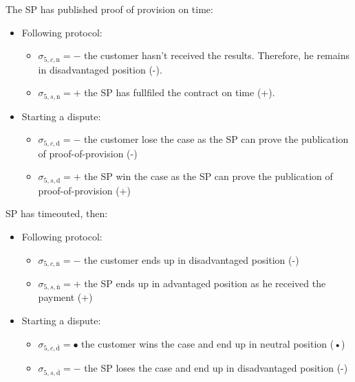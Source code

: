 \documentclass{ieeeaccess}
\begin{document}
The SP has published proof of provision on time:

\begin{itemize}
\item
  Following protocol:

  \begin{itemize}
  
  \item
    \(\sigma_{5, c, \mathrm{n}} = -\) the customer hasn't received the
    results. Therefore, he remains in disadvantaged position (-).
  \item
    \(\sigma_{5, s, \mathrm{n}} = +\) the SP has fullfiled the contract
    on time (+).
  \end{itemize}
\item
  Starting a dispute:

  \begin{itemize}
  
  \item
    \(\sigma_{5, c, \mathrm{d}} = -\) the customer lose the case as the
    SP can prove the publication of proof-of-provision (-)
  \item
    \(\sigma_{5, s, \mathrm{d}} = +\) the SP win the case as the SP can
    prove the publication of proof-of-provision (+)
  \end{itemize}
\end{itemize}

SP has timeouted, then:

\begin{itemize}
\item
  Following protocol:

  \begin{itemize}
  
  \item
    \(\sigma_{5, c, \overline{\mathrm{n}}} = -\) the customer ends up in
    disadvantaged position (-)
  \item
    \(\sigma_{5, s, \overline{\mathrm{n}}} = +\) the SP ends up in
    advantaged position as he received the payment (+)
  \end{itemize}
\item
  Starting a dispute:

  \begin{itemize}
  
  \item
    \(\sigma_{5, c, \overline{\mathrm{d}}} = •\) the customer wins the
    case and end up in neutral position (•)
  \item
    \(\sigma_{5, s, \overline{\mathrm{d}}} = -\) the SP loses the case
    and end up in disadvantaged position (-)
  \end{itemize}
\end{itemize}
\end{document}
